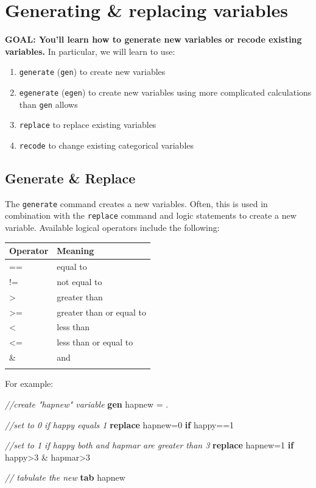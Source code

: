 \documentclass[
]{book}
\newenvironment{Shaded}{\begin{snugshade}}{\end{snugshade}}
\newcommand{\CommentTok}[1]{\textcolor[rgb]{0.56,0.35,0.01}{\textit{#1}}}
\newcommand{\KeywordTok}[1]{\textcolor[rgb]{0.13,0.29,0.53}{\textbf{#1}}}
\newcommand{\NormalTok}[1]{#1}
\providecommand{\tightlist}{%
  \setlength{\itemsep}{0pt}\setlength{\parskip}{0pt}}
\begin{document}
\hypertarget{generating-replacing-variables-1}{%
\section{Generating \& replacing variables}\label{generating-replacing-variables-1}}

\textbf{GOAL: You'll learn how to generate new variables or recode existing variables.} In particular, we will learn to use:

\begin{enumerate}
\def\labelenumi{\arabic{enumi}.}
\tightlist
\item
  \texttt{generate} (\texttt{gen}) to create new variables
\item
  \texttt{egenerate} (\texttt{egen}) to create new variables using more complicated calculations than \texttt{gen} allows
\item
  \texttt{replace} to replace existing variables
\item
  \texttt{recode} to change existing categorical variables
\end{enumerate}

\hypertarget{generate-replace}{%
\subsection{Generate \& Replace}\label{generate-replace}}

The \texttt{generate} command creates a new variables. Often, this is used in combination with the \texttt{replace} command and logic statements to create a new variable. Available logical operators include the following:

\begin{longtable}[]{@{}ll@{}}
\toprule
Operator & Meaning\tabularnewline
\midrule
\endhead
== & equal to\tabularnewline
!= & not equal to\tabularnewline
\textgreater{} & greater than\tabularnewline
\textgreater= & greater than or equal to\tabularnewline
\textless{} & less than\tabularnewline
\textless= & less than or equal to\tabularnewline
\& & and\tabularnewline
&\tabularnewline
\bottomrule
\end{longtable}

For example:

\begin{Shaded}
\begin{Highlighting}[]
\CommentTok{//create "hapnew" variable}
\KeywordTok{gen}\NormalTok{ hapnew = .}

\CommentTok{//set to 0 if happy equals 1}
\KeywordTok{replace}\NormalTok{ hapnew=0 }\KeywordTok{if}\NormalTok{ happy==1 }

\CommentTok{//set to 1 if happy both and hapmar are greater than 3}
\KeywordTok{replace}\NormalTok{ hapnew=1 }\KeywordTok{if}\NormalTok{ happy\textgreater{}3 \& hapmar\textgreater{}3}

\CommentTok{// tabulate the new }
\KeywordTok{tab}\NormalTok{ hapnew}
\end{Highlighting}
\end{Shaded}
\end{document}
